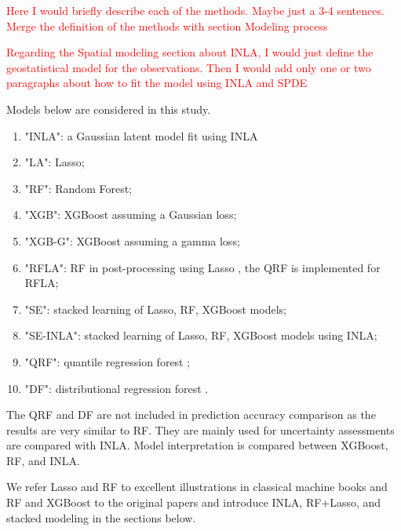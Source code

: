 \documentclass{article}
\begin{document}
 
\textcolor{red}{Here I would briefly describe each of the methods. Maybe just a 3-4 sentences. Merge the definition of the methods with section Modeling process}

\textcolor{red}{Regarding the Spatial modeling section about INLA, I would just define the geostatistical model for the observations. Then I would add only one or two paragraphs about how to fit the model using INLA and SPDE}

 
Models below are considered in this study. 
\begin{enumerate}
    
\item "INLA": a Gaussian latent model fit using INLA %
\item "LA": Lasso; 
\item "RF": Random Forest; 
\item "XGB": XGBoost assuming a Gaussian loss; 
\item "XGB-G": XGBoost assuming a gamma loss; 
\item "RFLA": RF in post-processing using Lasso \citep{hastie2009elements}, the QRF is implemented for RFLA; 
\item "SE": stacked learning of Lasso, RF, XGBoost models; 
\item "SE-INLA": stacked learning of Lasso, RF, XGBoost models using INLA;
\item "QRF": quantile regression forest \citep{meinshausen2006quantile};
\item "DF": distributional regression forest \citep{schlosser2019distributional}.
\end{enumerate}

The QRF and DF are not included in prediction accuracy comparison as the results are very similar to RF. They are mainly used for uncertainty assessments are compared with INLA. Model interpretation is compared between XGBoost, RF, and INLA. 



We refer Lasso and RF to excellent illustrations in classical machine books \citep{hastie2009elements,James2013introduction} and RF and XGBoost to the original papers \citep{breiman2001random,chen2016xgboost} and introduce INLA, RF+Lasso, and stacked modeling in the sections below.
\end{document}

